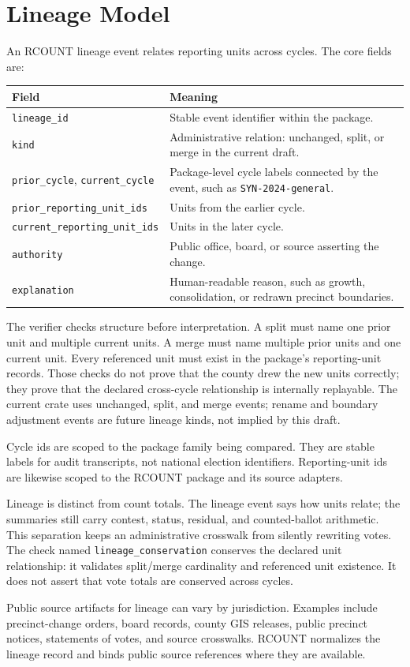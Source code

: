 \section{Lineage Model}

An RCOUNT lineage event relates reporting units across cycles. The core fields
are:

\begin{center}
\small
\begin{tabularx}{\textwidth}{lX}
\toprule
Field & Meaning \\
\midrule
\texttt{lineage\_id} & Stable event identifier within the package. \\
\texttt{kind} & Administrative relation: unchanged, split, or merge in the current draft. \\
\texttt{prior\_cycle}, \texttt{current\_cycle} & Package-level cycle labels connected by the event, such as \texttt{SYN-2024-general}. \\
\texttt{prior\_reporting\_unit\_ids} & Units from the earlier cycle. \\
\texttt{current\_reporting\_unit\_ids} & Units in the later cycle. \\
\texttt{authority} & Public office, board, or source asserting the change. \\
\texttt{explanation} & Human-readable reason, such as growth, consolidation, or redrawn precinct boundaries. \\
\bottomrule
\end{tabularx}
\end{center}

The verifier checks structure before interpretation. A split must name one prior
unit and multiple current units. A merge must name multiple prior units and one
current unit. Every referenced unit must exist in the package's reporting-unit
records. Those checks do not prove that the county drew the new units correctly;
they prove that the declared cross-cycle relationship is internally replayable.
The current crate uses unchanged, split, and merge events; rename and boundary
adjustment events are future lineage kinds, not implied by this draft.

Cycle ids are scoped to the package family being compared. They are stable
labels for audit transcripts, not national election identifiers. Reporting-unit
ids are likewise scoped to the RCOUNT package and its source adapters.

Lineage is distinct from count totals. The lineage event says how units relate;
the summaries still carry contest, status, residual, and counted-ballot
arithmetic. This separation keeps an administrative crosswalk from silently
rewriting votes. The check named \texttt{lineage\_conservation} conserves the
declared unit relationship: it validates split/merge cardinality and referenced
unit existence. It does not assert that vote totals are conserved across cycles.

Public source artifacts for lineage can vary by jurisdiction. Examples include
precinct-change orders, board records, county GIS releases, public precinct
notices, statements of votes, and source crosswalks. RCOUNT normalizes the
lineage record and binds public source references where they are available.
